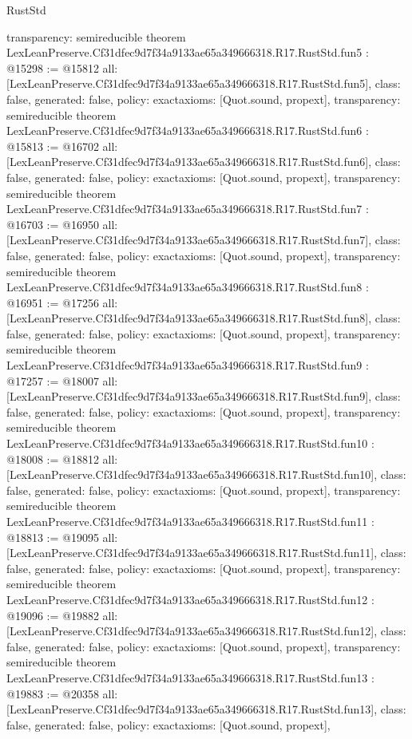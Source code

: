 \begin{lexlean}{RustStd}
\begin{coremodule}
{  transparency: semireducible
}
theorem LexLeanPreserve.Cf31dfec9d7f34a9133ae65a349666318.R17.RustStd.fun5 : @15298 := @15812 {
  all: [LexLeanPreserve.Cf31dfec9d7f34a9133ae65a349666318.R17.RustStd.fun5],
  class: false,
  generated: false,
  policy: exact{axioms: [Quot.sound, propext]},
  transparency: semireducible
}
theorem LexLeanPreserve.Cf31dfec9d7f34a9133ae65a349666318.R17.RustStd.fun6 : @15813 := @16702 {
  all: [LexLeanPreserve.Cf31dfec9d7f34a9133ae65a349666318.R17.RustStd.fun6],
  class: false,
  generated: false,
  policy: exact{axioms: [Quot.sound, propext]},
  transparency: semireducible
}
theorem LexLeanPreserve.Cf31dfec9d7f34a9133ae65a349666318.R17.RustStd.fun7 : @16703 := @16950 {
  all: [LexLeanPreserve.Cf31dfec9d7f34a9133ae65a349666318.R17.RustStd.fun7],
  class: false,
  generated: false,
  policy: exact{axioms: [Quot.sound, propext]},
  transparency: semireducible
}
theorem LexLeanPreserve.Cf31dfec9d7f34a9133ae65a349666318.R17.RustStd.fun8 : @16951 := @17256 {
  all: [LexLeanPreserve.Cf31dfec9d7f34a9133ae65a349666318.R17.RustStd.fun8],
  class: false,
  generated: false,
  policy: exact{axioms: [Quot.sound, propext]},
  transparency: semireducible
}
theorem LexLeanPreserve.Cf31dfec9d7f34a9133ae65a349666318.R17.RustStd.fun9 : @17257 := @18007 {
  all: [LexLeanPreserve.Cf31dfec9d7f34a9133ae65a349666318.R17.RustStd.fun9],
  class: false,
  generated: false,
  policy: exact{axioms: [Quot.sound, propext]},
  transparency: semireducible
}
theorem LexLeanPreserve.Cf31dfec9d7f34a9133ae65a349666318.R17.RustStd.fun10 : @18008 := @18812 {
  all: [LexLeanPreserve.Cf31dfec9d7f34a9133ae65a349666318.R17.RustStd.fun10],
  class: false,
  generated: false,
  policy: exact{axioms: [Quot.sound, propext]},
  transparency: semireducible
}
theorem LexLeanPreserve.Cf31dfec9d7f34a9133ae65a349666318.R17.RustStd.fun11 : @18813 := @19095 {
  all: [LexLeanPreserve.Cf31dfec9d7f34a9133ae65a349666318.R17.RustStd.fun11],
  class: false,
  generated: false,
  policy: exact{axioms: [Quot.sound, propext]},
  transparency: semireducible
}
theorem LexLeanPreserve.Cf31dfec9d7f34a9133ae65a349666318.R17.RustStd.fun12 : @19096 := @19882 {
  all: [LexLeanPreserve.Cf31dfec9d7f34a9133ae65a349666318.R17.RustStd.fun12],
  class: false,
  generated: false,
  policy: exact{axioms: [Quot.sound, propext]},
  transparency: semireducible
}
theorem LexLeanPreserve.Cf31dfec9d7f34a9133ae65a349666318.R17.RustStd.fun13 : @19883 := @20358 {
  all: [LexLeanPreserve.Cf31dfec9d7f34a9133ae65a349666318.R17.RustStd.fun13],
  class: false,
  generated: false,
  policy: exact{axioms: [Quot.sound, propext]},
}
\end{coremodule}
\end{lexlean}
